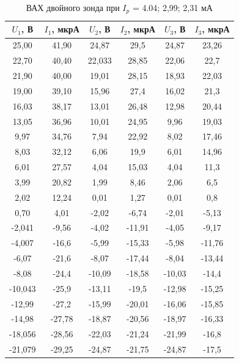 \begin{enumerate}
\begin{table}[h!]
\centering
\begin{tabular}{|c|c|c|c|c|c|}
\hline
$U_1$, В   & $I_1$, мкрА & $U_2$, В  & $I_2$, мкрА & $U_3$, В  & $I_3$, мкрА \\ \hline
25,00   & 41,90    & 24,87  & 29,5     & 24,87  & 23,26    \\ \hline
22,70   & 40,40    & 22,033 & 28,85    & 22,06  & 22,7     \\ \hline
21,90   & 40,00    & 19,01  & 28,15    & 18,93  & 22,03    \\ \hline
19,00   & 39,10    & 15,96  & 27,4     & 16,02  & 21,3     \\ \hline
16,03   & 38,17    & 13,01  & 26,48    & 12,98  & 20,44    \\ \hline
13,05   & 36,96    & 10,01  & 24,95    & 9,96   & 19,03    \\ \hline
9,97    & 34,76    & 7,94   & 22,92    & 8,02   & 17,46    \\ \hline
8,03    & 32,12    & 6,06   & 19,9     & 6,01   & 14,96    \\ \hline
6,01    & 27,57    & 4,04   & 15,03    & 4,04   & 11,3     \\ \hline
3,99    & 20,82    & 1,99   & 8,46     & 2,06   & 6,5      \\ \hline
2,02    & 12,24    & 0,01   & 1,27     & 0,01   & 0,8      \\ \hline
0,70    & 4,01     & -2,02  & -6,74    & -2,01  & -5,13    \\ \hline
-2,041  & -9,56    & -4,02  & -11,91   & -4,05  & -9,17    \\ \hline
-4,007  & -16,6    & -5,99  & -15,33   & -5,98  & -11,76   \\ \hline
-6,07   & -21,6    & -8,07  & -17,44   & -8,04  & -13,44   \\ \hline
-8,08   & -24,4    & -10,09 & -18,58   & -10,03 & -14,4    \\ \hline
-10,043 & -25,9    & -13,11 & -19,5    & -12,98 & -15,25   \\ \hline
-12,99  & -27,2    & -15,99 & -20,01   & -16,06 & -15,85   \\ \hline
-14,98  & -27,78   & -18,87 & -20,56   & -18,97 & -16,33   \\ \hline
-18,056 & -28,56   & -22,03 & -21,24   & -21,99 & -16,8    \\ \hline
-21,079 & -29,25   & -24,87 & -21,75   & -24,87 & -17,5    \\ \hline
\end{tabular}
\caption{ВАХ двойного зонда при $I_p$  = 4.04; 2,99; 2,31 мА}
\end{table}
\newpage

\end{enumerate}
